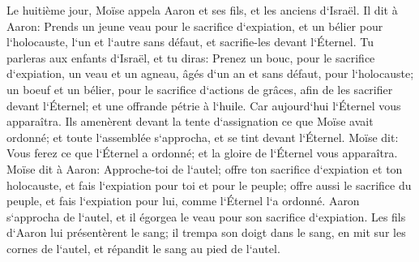 \verse Le huitième jour, Moïse appela Aaron et ses fils, et les anciens d`Israël. 
\verse Il dit à Aaron: Prends un jeune veau pour le sacrifice d`expiation, et un bélier pour l`holocauste, l`un et l`autre sans défaut, et sacrifie-les devant l`Éternel. 
\verse Tu parleras aux enfants d`Israël, et tu diras: Prenez un bouc, pour le sacrifice d`expiation, un veau et un agneau, âgés d`un an et sans défaut, pour l`holocauste; 
\verse un boeuf et un bélier, pour le sacrifice d`actions de grâces, afin de les sacrifier devant l`Éternel; et une offrande pétrie à l`huile. Car aujourd`hui l`Éternel vous apparaîtra. 
\verse Ils amenèrent devant la tente d`assignation ce que Moïse avait ordonné; et toute l`assemblée s`approcha, et se tint devant l`Éternel. 
\verse Moïse dit: Vous ferez ce que l`Éternel a ordonné; et la gloire de l`Éternel vous apparaîtra. 
\verse Moïse dit à Aaron: Approche-toi de l`autel; offre ton sacrifice d`expiation et ton holocauste, et fais l`expiation pour toi et pour le peuple; offre aussi le sacrifice du peuple, et fais l`expiation pour lui, comme l`Éternel l`a ordonné. 
\verse Aaron s`approcha de l`autel, et il égorgea le veau pour son sacrifice d`expiation. 
\verse Les fils d`Aaron lui présentèrent le sang; il trempa son doigt dans le sang, en mit sur les cornes de l`autel, et répandit le sang au pied de l`autel. 
